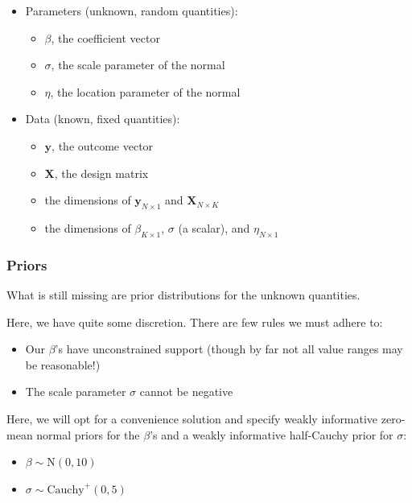 \documentclass[
  11pt,
]{article}
\providecommand{\tightlist}{%
  \setlength{\itemsep}{0pt}\setlength{\parskip}{0pt}}
\begin{document}
\begin{itemize}
\tightlist
\item
  Parameters (unknown, random quantities):

  \begin{itemize}
  \tightlist
  \item
    \(\beta\), the coefficient vector
  \item
    \(\sigma\), the scale parameter of the normal
  \item
    \(\eta\), the location parameter of the normal
  \end{itemize}
\item
  Data (known, fixed quantities):

  \begin{itemize}
  \tightlist
  \item
    \(\mathbf{y}\), the outcome vector
  \item
    \(\mathbf{X}\), the design matrix
  \item
    the dimensions of \(\mathbf{y}_{N \times 1}\) and \(\mathbf{X}_{N \times K}\)
  \item
    the dimensions of \(\beta_{K \times 1}\), \(\sigma\) (a scalar), and \(\eta_{N \times 1}\)
  \end{itemize}
\end{itemize}

\hypertarget{priors}{%
\subsubsection{Priors}\label{priors}}

What is still missing are prior distributions for the unknown quantities.

Here, we have quite some discretion. There are few rules we must adhere to:

\begin{itemize}
\tightlist
\item
  Our \(\beta\)'s have unconstrained support (though by far not all value ranges may be reasonable!)
\item
  The scale parameter \(\sigma\) cannot be negative
\end{itemize}

Here, we will opt for a convenience solution and specify weakly informative zero-mean normal priors for the \(\beta\)'s and a weakly informative half-Cauchy prior for \(\sigma\):

\begin{itemize}
\tightlist
\item
  \(\beta \sim \text{N}(0, 10)\)
\item
  \(\sigma \sim \text{Cauchy}^{+}(0, 5)\)
\end{itemize}
\end{document}
